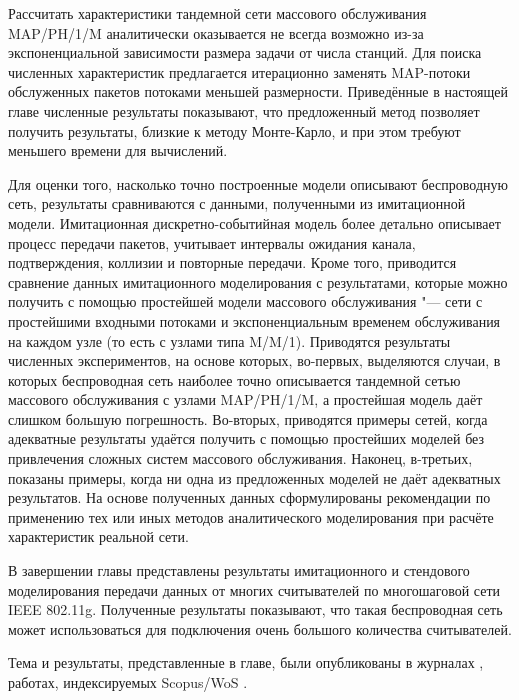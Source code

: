 Рассчитать характеристики тандемной сети массового обслуживания MAP/PH/1/M аналитически оказывается не всегда возможно из-за экспоненциальной зависимости размера задачи от числа станций. Для поиска численных характеристик предлагается итерационно заменять MAP-потоки обслуженных пакетов потоками меньшей размерности. Приведённые в настоящей главе численные результаты показывают, что предложенный метод позволяет получить результаты, близкие к методу Монте-Карло, и при этом требуют меньшего времени для вычислений.

Для оценки того, насколько точно построенные модели описывают беспроводную сеть, результаты сравниваются с данными, полученными из имитационной модели. Имитационная дискретно-событийная модель более детально описывает процесс передачи пакетов, учитывает интервалы ожидания канала, подтверждения, коллизии и повторные передачи. Кроме того, приводится сравнение данных имитационного моделирования с результатами, которые можно получить с помощью простейшей модели массового обслуживания "--- сети с простейшими входными потоками и экспоненциальным временем обслуживания на каждом узле (то есть с узлами типа M/M/1). Приводятся результаты численных экспериментов, на основе которых, во-первых, выделяются случаи, в которых беспроводная сеть наиболее точно описывается тандемной сетью массового обслуживания с узлами MAP/PH/1/M, а простейшая модель даёт слишком большую погрешность. Во-вторых, приводятся примеры сетей, когда адекватные результаты удаётся получить с помощью простейших моделей без привлечения сложных систем массового обслуживания. Наконец, в-третьих, показаны примеры, когда ни одна из предложенных моделей не даёт адекватных результатов. На основе полученных данных сформулированы рекомендации по применению тех или иных методов аналитического моделирования при расчёте характеристик реальной сети.

В завершении главы представлены результаты имитационного и стендового моделирования передачи данных от многих считывателей по многошаговой сети IEEE 802.11g. Полученные результаты показывают, что такая беспроводная сеть может использоваться для подключения очень большого количества считывателей.

Тема и результаты, представленные в главе, были опубликованы в журналах \cite{WINET_IJPAM2016, WINET_TCOMM2015, QS_JITCS2013, QS_JPU2013, QS_TCOMM2012}, работах, индексируемых Scopus/WoS \cite{QS_ICAAPSP2020, QS_ITMM2019, QS_ITMM2017, QS_AICT2017, QS_ITMM2016, QS_DCCN2016_CCIS}.






